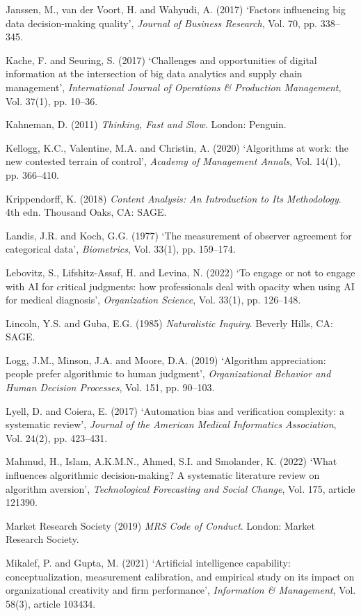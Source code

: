 \documentclass[12pt,a4paper]{article}
\begin{document}
{\rf Janssen, M., van der Voort, H. and Wahyudi, A. (2017) `Factors influencing big data decision-making quality', \emph{Journal of Business Research}, Vol. 70, pp. 338--345.

\rf Kache, F. and Seuring, S. (2017) `Challenges and opportunities of digital information at the intersection of big data analytics and supply chain management', \emph{International Journal of Operations \& Production Management}, Vol. 37(1), pp. 10--36.

\rf Kahneman, D. (2011) \emph{Thinking, Fast and Slow}. London: Penguin.

\rf Kellogg, K.C., Valentine, M.A. and Christin, A. (2020) `Algorithms at work: the new contested terrain of control', \emph{Academy of Management Annals}, Vol. 14(1), pp. 366--410.

\rf Krippendorff, K. (2018) \emph{Content Analysis: An Introduction to Its Methodology}. 4th edn. Thousand Oaks, CA: SAGE.

\rf Landis, J.R. and Koch, G.G. (1977) `The measurement of observer agreement for categorical data', \emph{Biometrics}, Vol. 33(1), pp. 159--174.

\rf Lebovitz, S., Lifshitz-Assaf, H. and Levina, N. (2022) `To engage or not to engage with AI for critical judgments: how professionals deal with opacity when using AI for medical diagnosis', \emph{Organization Science}, Vol. 33(1), pp. 126--148.

\rf Lincoln, Y.S. and Guba, E.G. (1985) \emph{Naturalistic Inquiry}. Beverly Hills, CA: SAGE.

\rf Logg, J.M., Minson, J.A. and Moore, D.A. (2019) `Algorithm appreciation: people prefer algorithmic to human judgment', \emph{Organizational Behavior and Human Decision Processes}, Vol. 151, pp. 90--103.

\rf Lyell, D. and Coiera, E. (2017) `Automation bias and verification complexity: a systematic review', \emph{Journal of the American Medical Informatics Association}, Vol. 24(2), pp. 423--431.

\rf Mahmud, H., Islam, A.K.M.N., Ahmed, S.I. and Smolander, K. (2022) `What influences algorithmic decision-making? A systematic literature review on algorithm aversion', \emph{Technological Forecasting and Social Change}, Vol. 175, article 121390.

\rf Market Research Society (2019) \emph{MRS Code of Conduct}. London: Market Research Society.

\rf Mikalef, P. and Gupta, M. (2021) `Artificial intelligence capability: conceptualization, measurement calibration, and empirical study on its impact on organizational creativity and firm performance', \emph{Information \& Management}, Vol. 58(3), article 103434.

}
\end{document}
